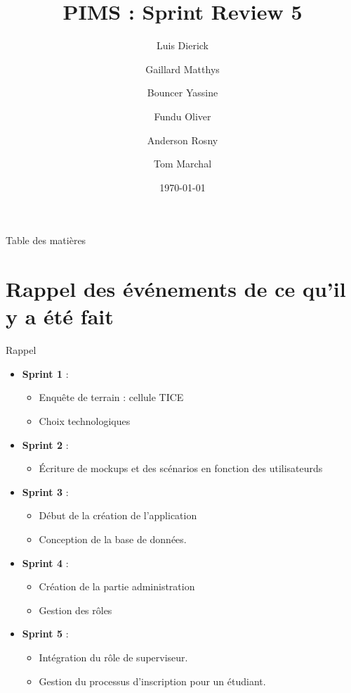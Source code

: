 \documentclass[numbering=fraction]{beamer}
\title{PIMS : Sprint Review 5}
\author[PIMS]{Luis Dierick \and Gaillard Matthys \and Bouncer Yassine \and Fundu Oliver \and Anderson Rosny \and Tom Marchal }
\institute{Université de Namur}
\date{\today}
\begin{document}
\begin{frame}[plain]{}
    \maketitle
\end{frame}

\begin{frame}{Table des matières}
    \tableofcontents
\end{frame}
\section{Rappel des événements de ce qu'il y a été fait}
\begin{frame}{Rappel}
    \begin{itemize}
        \item \textbf{Sprint 1} :
        \begin{itemize}
            \item Enquête de terrain : cellule TICE 
            \item Choix technologiques
        \end{itemize}
        \item \textbf{Sprint 2} : 
        \begin{itemize}
            \item Écriture de mockups et des scénarios en fonction des utilisateurds
        \end{itemize}
        \item \textbf{Sprint 3} :
        \begin{itemize}
            \item Début de la création de l'application
            \item Conception de la base de données.
        \end{itemize}
        \item \textbf{Sprint 4} :
        \begin{itemize}
            \item Création de la partie administration
            \item Gestion des rôles
        \end{itemize}
        \item \textbf{Sprint 5} :
        \begin{itemize}
            \item Intégration du rôle de superviseur.
            \item Gestion du processus d'inscription pour un étudiant.
        \end{itemize}
            
    \end{itemize}
\end{frame}
\end{document}
